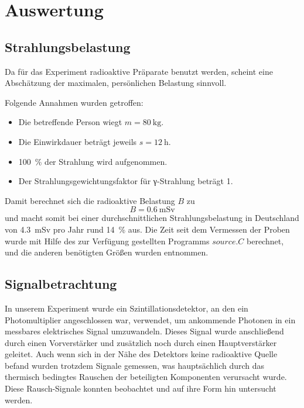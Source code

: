 \section{Auswertung}

\subsection{Strahlungsbelastung}

Da für das Experiment radioaktive Präparate benutzt werden, scheint eine
Abschätzung der maximalen, persönlichen Belastung sinnvoll.

Folgende Annahmen wurden getroffen:
\begin{itemize}
  \item Die betreffende Person wiegt $m = \SI{80}{\kilo\gram}$.
  \item Die Einwirkdauer beträgt jeweils $s = \SI{12}{\hour}$.
  \item \SI{100}{\percent} der Strahlung wird aufgenommen.
  \item Der Strahlungsgewichtungsfaktor für γ-Strahlung beträgt 1.
\end{itemize}
Damit berechnet sich die radioaktive Belastung $B$ zu
\begin{equation}
  B = \SI{0,6}{\milli\sievert}
\end{equation}
und macht somit bei einer durchschnittlichen Strahlungsbelastung in Deutschland von
\SI{4.3}{\milli\sievert} pro Jahr rund \SI{14}{\percent} aus. Die Zeit seit dem
Vermessen der Proben wurde mit Hilfe des zur Verfügung gestellten Programms
$source.C$ berechnet, und die anderen benötigten Größen wurden \cite[Tab.1]{script}
entnommen.

\subsection{Signalbetrachtung}
In unserem Experiment wurde ein Szintillationsdetektor, an den ein
Photomultiplier angeschlossen war, verwendet, um ankommende Photonen in ein
messbares elektrisches Signal umzuwandeln. Dieses Signal wurde anschließend
durch einen Vorverstärker und zusätzlich noch durch einen Hauptverstärker
geleitet. Auch wenn sich in der Nähe des Detektors keine radioaktive Quelle
befand wurden trotzdem Signale gemessen, was hauptsächlich durch das thermisch
bedingtes Rauschen der beteiligten Komponenten verursacht wurde. Diese
Rausch-Signale konnten beobachtet und auf ihre Form hin untersucht werden.

